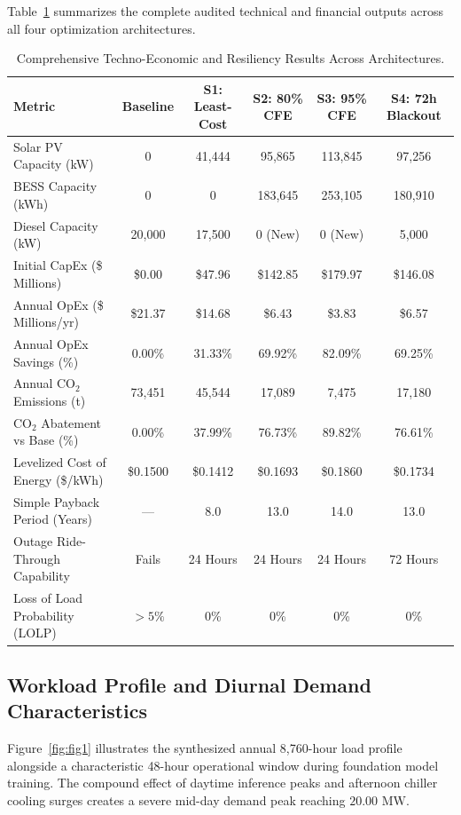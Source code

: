\documentclass[12pt,3p,review]{elsarticle}
\begin{document}
Table~\ref{tab:results} summarizes the complete audited technical and financial outputs across all four optimization architectures.

\begin{table}[htbp]
\centering
\small
\caption{Comprehensive Techno-Economic and Resiliency Results Across Architectures.}
\label{tab:results}
\begin{tabular}{lccccc}
\toprule
\textbf{Metric} & \textbf{Baseline} & \textbf{S1: Least-Cost} & \textbf{S2: 80\% CFE} & \textbf{S3: 95\% CFE} & \textbf{S4: 72h Blackout} \\
\midrule
Solar PV Capacity (kW) & 0 & 41,444 & 95,865 & 113,845 & 97,256 \\
BESS Capacity (kWh) & 0 & 0 & 183,645 & 253,105 & 180,910 \\
Diesel Capacity (kW) & 20,000 & 17,500 & 0 (New) & 0 (New) & 5,000 \\
Initial CapEx (\$ Millions) & \$0.00 & \$47.96 & \$142.85 & \$179.97 & \$146.08 \\
Annual OpEx (\$ Millions/yr) & \$21.37 & \$14.68 & \$6.43 & \$3.83 & \$6.57 \\
Annual OpEx Savings (\%) & 0.00\% & 31.33\% & 69.92\% & 82.09\% & 69.25\% \\
Annual CO$_2$ Emissions (t) & 73,451 & 45,544 & 17,089 & 7,475 & 17,180 \\
CO$_2$ Abatement vs Base (\%) & 0.00\% & 37.99\% & 76.73\% & 89.82\% & 76.61\% \\
Levelized Cost of Energy (\$/kWh) & \$0.1500 & \$0.1412 & \$0.1693 & \$0.1860 & \$0.1734 \\
Simple Payback Period (Years) & — & 8.0 & 13.0 & 14.0 & 13.0 \\
Outage Ride-Through Capability & Fails & 24 Hours & 24 Hours & 24 Hours & 72 Hours \\
Loss of Load Probability (LOLP) & $>5\%$ & 0\% & 0\% & 0\% & 0\% \\
\bottomrule
\end{tabular}
\end{table}

\subsection{Workload Profile and Diurnal Demand Characteristics}

Figure~\ref{fig:fig1} illustrates the synthesized annual 8,760-hour load profile alongside a characteristic 48-hour operational window during foundation model training. The compound effect of daytime inference peaks and afternoon chiller cooling surges creates a severe mid-day demand peak reaching $20.00\text{ MW}$.
\end{document}
